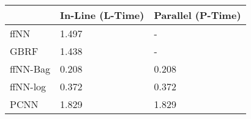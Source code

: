 \begin{tabular}{lll}
\toprule
{} & In-Line (L-Time) & Parallel (P-Time) \\
\midrule
ffNN     &            1.497 &                 - \\
GBRF     &            1.438 &                 - \\
ffNN-Bag &            0.208 &             0.208 \\
ffNN-log &            0.372 &             0.372 \\
PCNN     &            1.829 &             1.829 \\
\bottomrule
\end{tabular}
